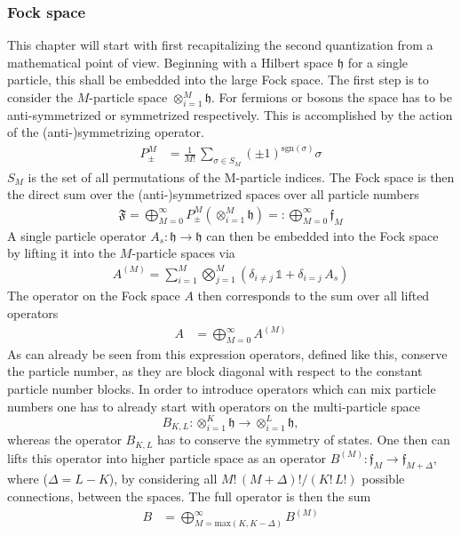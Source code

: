 \subsubsection{Fock space}
This chapter will start with first recapitalizing the second quantization from a mathematical point of view. Beginning with a Hilbert space $\mathfrak{h}$ for a single particle, this shall be embedded into the large Fock space. The first step is to consider the $M$-particle space $\otimes_{i=1}^M\mathfrak{h}$. For fermions or bosons the space has to be anti-symmetrized or symmetrized respectively. This is accomplished by the action of the (anti-)symmetrizing operator.
\begin{align*}
    P_\pm^M&=\frac{1}{M!}\,\sum_{\sigma\in S_M}(\pm1)^{\text{sgn}(\sigma)}\sigma 
\end{align*}
$S_M$ is the set of all permutations of the M-particle indices.
The Fock space is then the direct sum over the (anti-)symmetrized spaces over all particle numbers
\begin{align*}
    \mathfrak{F}=\bigoplus_{M=0}^\infty P^M_\pm\left(\otimes_{i=1}^M\mathfrak{h}\right)=: \bigoplus_{M=0}^\infty\mathfrak{f}_M
\end{align*}
A single particle operator $A_s:\mathfrak{h}\to\mathfrak{h}$ can then be embedded into the Fock space by lifting it into the $M$-particle spaces via
\begin{align*}
    A^{(M)}=\sum_{i=1}^M\bigotimes_{j=1}^M\left( \delta_{i\neq j}\,\mathbb{1} + \delta_{i=j}\,A_s \right)
\end{align*}
The operator on the Fock space $A$ then corresponds to the sum over all lifted operators
\begin{align*}
    A&= \bigoplus_{M=0}^\infty A^{(M)}
\end{align*}
As can already be seen from this expression operators, defined like this, conserve the particle number, as they are block diagonal with respect to the constant particle number blocks. In order to introduce operators which can mix particle numbers one has to already start with operators on the multi-particle space $$B_{K,L}:\otimes_{i=1}^K\mathfrak{h} \to \otimes_{i=1}^L\mathfrak{h},$$ 
whereas the operator $B_{K,L}$ has to conserve the symmetry of states.
One then can lifts this operator into higher particle space as an operator $B^{(M)}:\mathfrak{f}_M\to\mathfrak{f}_{M+\Delta}$, where ($\Delta=L-K$), by considering all $M!\,(M+\Delta)!/(K!\,L!)$ possible connections, between the spaces. The full operator is then the sum
\begin{align*}
    B&= \bigoplus_{M=\text{max}(K,K-\Delta)}^\infty B^{(M)}
\end{align*}
